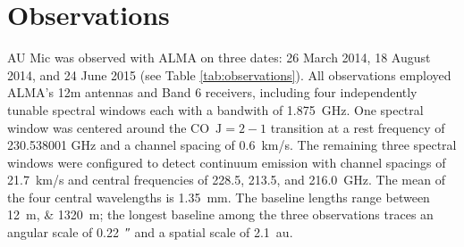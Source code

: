 \documentclass[modern]{aastex62}
\begin{document}
\section{Observations}
\label{section: observations}
AU Mic was observed  with ALMA on three dates: 26 March 2014, 18 August 2014, and 24 June 2015 (see Table \ref{tab:observations}).
All observations employed ALMA's 12m antennas and Band 6 receivers, including four independently tunable spectral windows each with a bandwith of \SI{1.875}{GHz}. 
One spectral window was centered around the CO~$\mathrm{J}=2-1$ transition at a rest frequency of 230.538001 GHz and a channel spacing of \SI{0.6}{km/s}.
The remaining three spectral windows were configured to detect continuum emission with channel spacings of \SI{21.7}{km/s} and central frequencies of 228.5, 213.5, and \SI{216.0}{GHz}.
The mean of the four central wavelengths is \SI{1.35}{mm}.
The baseline lengths range between \SIlist{12;1320}{m}; the longest baseline among the three observations traces an angular scale of \SI{0.22}{\arcsecond} and a spatial scale of \SI{2.1}{au}.
\end{document}

